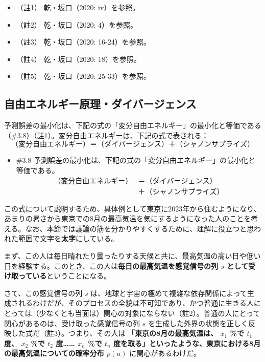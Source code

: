 \begin{itemize}
\tightlist
\item
  （註1） 乾・坂口（2020: iv）\cite{InuiAndSakaguchi}を参照。
\item
  （註2） 乾・坂口（2020: 4）\cite{InuiAndSakaguchi}を参照。
\item
  （註3） 乾・坂口（2020: 16-24）\cite{InuiAndSakaguchi}を参照。
\item
  （註4） 乾・坂口（2020: 18）\cite{InuiAndSakaguchi}を参照。
\item
  （註5） 乾・坂口（2020: 25-33）\cite{InuiAndSakaguchi}を参照。
\end{itemize}

\subsection{自由エネルギー原理・ダイバージェンス}\label{ux81eaux7531ux30a8ux30cdux30ebux30aeux30fcux539fux7406ux30c0ux30a4ux30d0ux30fcux30b8ux30a7ux30f3ux30b9}

\mbox{予測誤差}の最小化は、下記の式の「変分自由エネルギー」の最小化と等価である（\#3.8）（註1）。変分自由エネルギーは、下記の式で表される：
\[
（変分自由エネルギー）＝（ダイバージェンス）＋（シャノンサプライズ）\tag{1}
\]

\begin{note}{}
  \begin{itemize}
    \tightlist
    \item{\#3.8}
      \mbox{予測誤差}の最小化は、下記の式の「変分自由エネルギー」の最小化と等価である。$$\begin{aligned}（変分自由エネルギー）&＝（ダイバージェンス）\\ &＋（シャノンサプライズ）\end{aligned}$$
  \end{itemize}
\end{note}

この式について説明するため、具体例として東京に2023年から住むようになり、あまりの暑さから東京での8月の最高気温を気にするようになった人のことを考える。なお、本節では議論の筋を分かりやすくするために、理解に役立つと思われた範囲で文字を\textbf{太字}にしている。

まず、この人は毎日晴れたり曇ったりする天候と共に、最高気温の高い日や低い日を経験する。このとき、この人は\textbf{毎日の最高気温を感覚信号の列
\(s\) として受け取っている}ということになる。

さて、この感覚信号の列 \(s\)
は、地球と宇宙の極めて複雑な依存関係によって生成されるわけだが、そのプロセスの全貌は不可知であり、かつ普通に生きる人にとっては（少なくとも当面は）関心の対象にならない（註2）。普通の人にとって関心があるのは、受け取った感覚信号の列
\(s\) を生成した外界の状態を正しく反映した式だ（註3）。つまり、その人は
\textbf{「東京の8月の最高気温は、 \(x_1\) \%で \(t_1\) 度、 \(x_2\) \%で
\(t_2\) 度\ldots\ldots{} \(x_n\) \%で \(t_n\)
度を取る」といったような、東京における8月の最高気温についての確率分布
\(p(u)\)} に関心があるわけだ。

